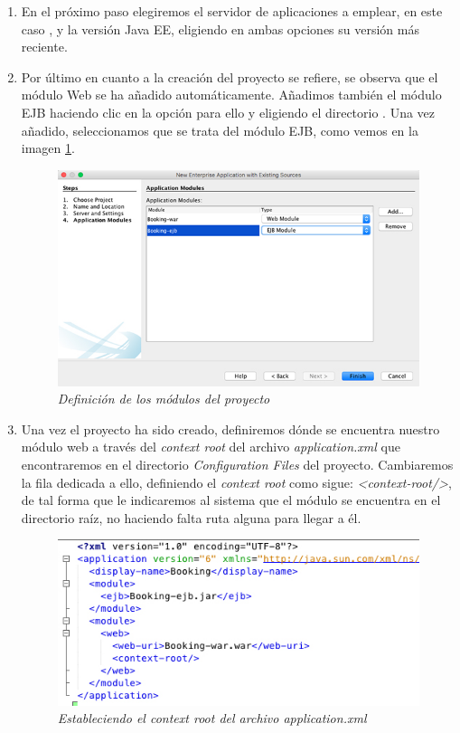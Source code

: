 \begin{enumerate}
\item En el próximo paso elegiremos el servidor de aplicaciones a emplear, en este caso , y la versión Java EE, eligiendo en ambas opciones su versión más reciente. 
\item Por último en cuanto a la creación del proyecto se refiere, se observa que el módulo Web  se ha añadido automáticamente. Añadimos también el módulo EJB haciendo clic en la opción para ello y eligiendo el directorio . Una vez añadido, seleccionamos que se trata del módulo EJB, como vemos en la imagen \ref{fig:modulos-proyecto}.

\begin{figure}
\centering
  \includegraphics[scale=.55]{img/instalacion/modulos-proyecto.jpg}
  \caption{\textit{Definición de los módulos del proyecto}}
  \label{fig:modulos-proyecto}
\end{figure}

\item Una vez el proyecto ha sido creado, definiremos dónde se encuentra nuestro módulo web a través del \textit{context root} del archivo \textit{application.xml} que encontraremos en el directorio \textit{Configuration Files} del proyecto. Cambiaremos la fila dedicada a ello, definiendo el \textit{context root} como sigue: \textit{<context-root/>}, de tal forma que le indicaremos al sistema que el módulo se encuentra en el directorio raíz, no haciendo falta ruta alguna para llegar a él.

\begin{figure}
\centering
  \includegraphics[scale=.60]{img/instalacion/context-root.jpg}
  \caption{\textit{Estableciendo el context root del archivo application.xml}}
  \label{fig:context-root}
\end{figure}


\end{enumerate}
